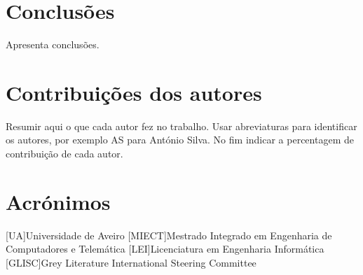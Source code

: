 \documentclass{report}
\begin{document}
\chapter{Conclusões}
\label{chap.conclusao}
Apresenta conclusões.

\chapter*{Contribuições dos autores}
Resumir aqui o que cada autor fez no trabalho.
Usar abreviaturas para identificar os autores,
por exemplo AS para António Silva.
No fim indicar a percentagem de contribuição de cada autor.

\chapter*{Acrónimos}
\begin{acronym}
[UA]{Universidade de Aveiro}
[MIECT]{Mestrado Integrado em Engenharia de Computadores e Telemática}
[LEI]{Licenciatura em Engenharia Informática}
[GLISC]{Grey Literature International Steering Committee}
\end{acronym}


\printbibliography
\end{document}
